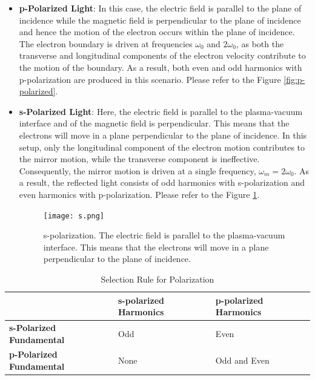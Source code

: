 \begin{itemize}
    \item \textbf{p-Polarized Light}: In this case, the electric field is parallel to the plane of incidence while the magnetic field is perpendicular to the plane of incidence and hence the motion of the electron occurs within the plane of incidence. The electron boundary is driven at frequencies $\omega_0$ and $2\omega_0$, as both the transverse and longitudinal components of the electron velocity contribute to the motion of the boundary. As a result, both even and odd harmonics with p-polarization are produced in this scenario. Please refer to the Figure \ref{fig:p-polarized}.
    \item \textbf{s-Polarized Light}: Here, the electric field is parallel to the plasma-vacuum interface and of the magnetic field is perpendicular. This means that the electrons will move in a plane perpendicular to the plane of incidence. In this setup, only the longitudinal component of the electron motion contributes to the mirror motion, while the transverse component is ineffective. Consequently, the mirror motion is driven at a single frequency, $\omega_m = 2\omega_0$. As a result, the reflected light consists of odd harmonics with s-polarization and even harmonics with p-polarization. Please refer to the Figure \ref{fig:s-polarized}.
          \begin{figure}[H]
              \centering
              \texttt{[image: s.png]}
              \caption{s-polarization. The electric field is parallel to the plasma-vacuum interface. This means that the electrons will move in a plane perpendicular to the plane of incidence.}
              \label{fig:s-polarized}
          \end{figure}
\end{itemize}

\begin{table}[h]
    \centering
    \caption{Selection Rule for Polarization}
    \vspace{0.5cm}
    \label{tab:selection-rule}
    \begin{tabular}{|l|l|l|}
        \hline
                                         & \textbf{s-polarized Harmonics} & \textbf{p-polarized Harmonics} \\ \hline
        \textbf{s-Polarized Fundamental} & Odd                            & Even                           \\ \hline
        \textbf{p-Polarized Fundamental} & None                           & Odd and Even                   \\ \hline
    \end{tabular}
\end{table}

